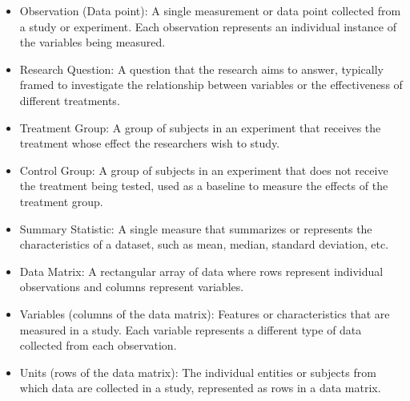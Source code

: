 \documentclass{article}
\begin{document}
\begin{itemize}
    \item Observation (Data point): A single measurement or data point collected from a study or experiment. Each observation represents an individual instance of the variables being measured.

    \item Research Question: A question that the research aims to answer, typically framed to investigate the relationship between variables or the effectiveness of different treatments.

    \item Treatment Group: A group of subjects in an experiment that receives the treatment whose effect the researchers wish to study.

    \item Control Group: A group of subjects in an experiment that does not receive the treatment being tested, used as a baseline to measure the effects of the treatment group.

    \item Summary Statistic: A single measure that summarizes or represents the characteristics of a dataset, such as mean, median, standard deviation, etc.

    \item Data Matrix: A rectangular array of data where rows represent individual observations and columns represent variables.

    \item Variables (columns of the data matrix): Features or characteristics that are measured in a study. Each variable represents a different type of data collected from each observation.

    \item Units (rows of the data matrix): The individual entities or subjects from which data are collected in a study, represented as rows in a data matrix.


\end{itemize}
\end{document}
